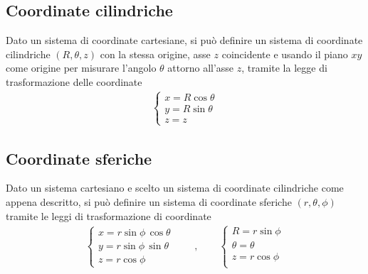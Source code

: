 \documentclass[letterpaper,10pt,italian]{jupyterBook}
\begin{document}
\subsection{Coordinate cilindriche}
\label{\detokenize{ch/analytic_geometry/analytic_geometry_3d/points:coordinate-cilindriche}}\label{\detokenize{ch/analytic_geometry/analytic_geometry_3d/points:geometry-analytic-3d-coordinates-cylindrical}}
\sphinxAtStartPar
Dato un sistema di coordinate cartesiane, si può definire un sistema di coordinate cilindriche \((R, \theta, z)\) con la stessa origine, asse \(z\) coincidente e usando il piano \(x\)\sphinxhyphen{}\(y\) come origine per misurare l’angolo \(\theta\) attorno all’asse \(z\), tramite la legge di trasformazione delle coordinate
\begin{equation*}
\begin{split}\begin{cases}
x = R \cos \theta \\
y = R \sin \theta \\
z = z
\end{cases}\end{split}
\end{equation*}

\subsection{Coordinate sferiche}
\label{\detokenize{ch/analytic_geometry/analytic_geometry_3d/points:coordinate-sferiche}}\label{\detokenize{ch/analytic_geometry/analytic_geometry_3d/points:geometry-analytic-3d-coordinates-spherical}}
\sphinxAtStartPar
Dato un sistema cartesiano e scelto un sistema di coordinate cilindriche come appena descritto, si può definire un sistema di coordinate sferiche \((r, \theta, \phi)\) tramite le leggi di trasformazione di coordinate
\begin{equation*}
\begin{split}
\begin{cases}
x = r \sin \phi \, \cos \theta \\
y = r \sin \phi \, \sin \theta \\
z = r \cos \phi
\end{cases}
\qquad , \qquad
\begin{cases}
R = r \sin \phi \\
\theta = \theta \\
z = r \cos \phi \\
\end{cases}
\end{split}
\end{equation*}
\end{document}
